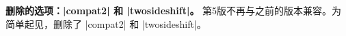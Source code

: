 \begin{paracol}{2}
    \switchcolumn*
    \switchcolumn
    
    \switchcolumn*
    \switchcolumn
    
    \switchcolumn*
    \switchcolumn
    \item \textbf{删除的选项：|compat2| 和 |twosideshift|。}
    第5版不再与之前的版本兼容。为简单起见，删除了 |compat2| 和 |twosideshift|。
    \end{paracol}
